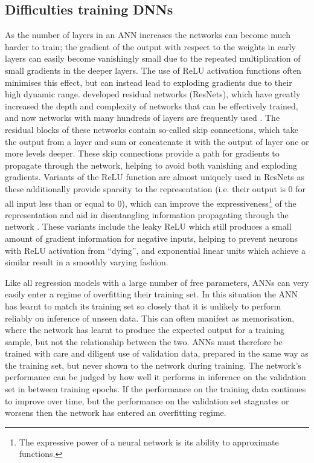 \subsection{Difficulties training DNNs}

As the number of layers in an ANN increases the networks can become much harder to train; the gradient of the output with respect to the weights in early layers can easily become vanishingly small due to the repeated multiplication of small gradients in the deeper layers.
The use of ReLU activation functions often minimises this effect, but can instead lead to exploding gradients due to their high dynamic range.
\citet{2015He} developed residual networks (ResNets), which have greatly increased the depth and complexity of networks that can be effectively trained, and now networks with many hundreds of layers are frequently used \citep[e.g.][]{Jegou2017}.
The residual blocks of these networks contain so-called skip connections, which take the output from a layer and sum or concatenate it with the output of layer one or more levels deeper.
These skip connections provide a path for gradients to propagate through the network, helping to avoid both vanishing and exploding gradients.
Variants of the ReLU function are almost uniquely used in ResNets as these additionally provide sparsity to the representation (i.e. their output is 0 for all input less than or equal to 0), which can improve the expressiveness\footnote{The expressive power of a neural network is its ability to approximate functions.} of the representation and aid in disentangling information propagating through the network \citep{Glorot2011}.
These variants include the leaky ReLU \citep[$\max(0.01x, x)$,][]{Maas2013} which still produces a small amount of gradient information for negative inputs, helping to prevent neurons with ReLU activation from ``dying'', and exponential linear units \citep[ELUs,][]{Clevert2015} which achieve a similar result in a smoothly varying fashion.

Like all regression models with a large number of free parameters, ANNs can very easily enter a regime of overfitting their training set.
In this situation the ANN has learnt to match its training set so closely that it is unlikely to perform reliably on inference of unseen data.
This can often manifest as memorisation, where the network has learnt to produce the expected output for a training sample, but not the relationship between the two.
ANNs must therefore be trained with care and diligent use of validation data, prepared in the same way as the training set, but never shown to the network during training.
The network's performance can be judged by how well it performs in inference on the validation set in between training epochs.
If the performance on the training data continues to improve over time, but the performance on the validation set stagnates or worsens then the network has entered an overfitting regime.

